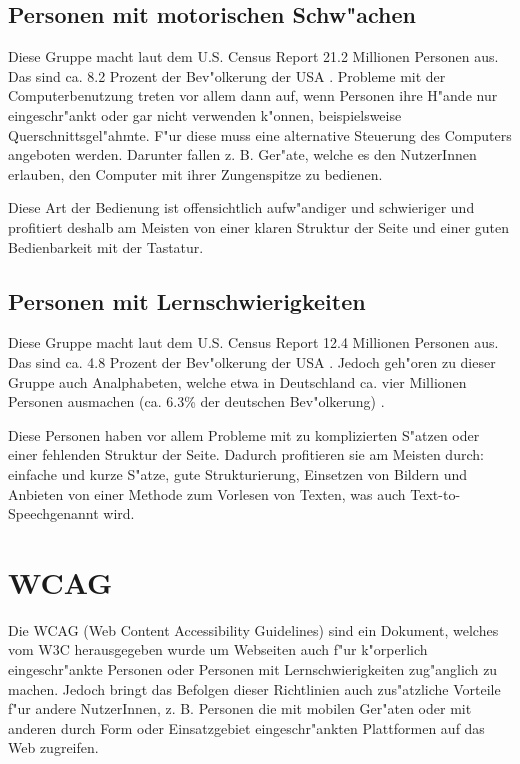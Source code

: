 \documentclass[a4paper,bibtotoc,oneside]{scrbook}
\begin{document}
\section{Personen mit motorischen Schw"achen}
Diese Gruppe macht laut dem U.S. Census Report 21.2 Millionen Personen aus. Das
sind ca. 8.2 Prozent der Bev"olkerung der USA \cite[S. 1]{us_cens}. Probleme mit der Computerbenutzung treten vor allem dann auf, wenn Personen ihre H"ande nur eingeschr"ankt oder gar nicht verwenden k"onnen, beispielsweise Querschnittsgel"ahmte. F"ur diese muss eine alternative Steuerung des Computers angeboten werden. Darunter fallen z. B. Ger"ate, welche es den NutzerInnen erlauben, den Computer mit ihrer Zungenspitze zu bedienen.\cite[S. 15-16]{barr_webd}

Diese Art der Bedienung ist offensichtlich aufw"andiger und schwieriger und profitiert deshalb am Meisten von einer klaren Struktur der Seite und einer guten Bedienbarkeit mit der Tastatur.\cite[S. 15-16]{barr_webd}\cite[S. 18]{understand_acc}

\section{Personen mit Lernschwierigkeiten}
Diese Gruppe macht laut dem U.S. Census Report 12.4 Millionen Personen aus. Das
sind ca. 4.8 Prozent der Bev"olkerung der USA \cite[S. 1]{us_cens}. Jedoch geh"oren zu dieser Gruppe auch Analphabeten, welche etwa in Deutschland ca. vier Millionen Personen ausmachen (ca. 6.3\% der deutschen Bev"olkerung) \cite[S. 19]{understand_acc}.

Diese Personen haben vor allem Probleme mit zu komplizierten S"atzen oder einer fehlenden Struktur der Seite. Dadurch profitieren sie am Meisten durch: einfache und kurze S"atze, gute Strukturierung, Einsetzen von Bildern und Anbieten von einer Methode zum Vorlesen von Texten, was auch \glqq Text-to-Speech\grqq genannt wird. \cite[S. 18-19]{barr_webd}\cite[S. 19]{understand_acc}

\chapter{WCAG}
Die WCAG (Web Content Accessibility Guidelines) sind ein Dokument, welches vom W3C herausgegeben wurde um Webseiten auch f"ur k"orperlich eingeschr"ankte Personen oder Personen mit Lernschwierigkeiten zug"anglich zu machen. Jedoch bringt das Befolgen dieser Richtlinien auch zus"atzliche Vorteile f"ur andere NutzerInnen, z. B. Personen die mit mobilen Ger"aten oder mit anderen durch Form oder Einsatzgebiet eingeschr"ankten Plattformen auf das Web zugreifen. \cite[Abschnitt Abstract]{wcag1}
\end{document}
